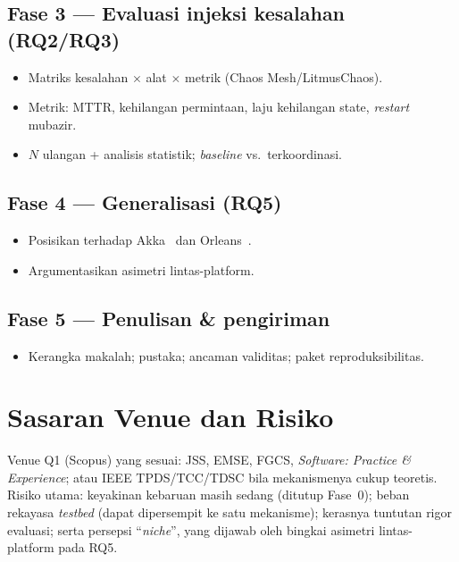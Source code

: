 \subsection*{Fase 3 --- Evaluasi injeksi kesalahan (RQ2/RQ3)}
\begin{itemize}[leftmargin=2.2em,nosep]
  \item[\cbtodo] Matriks kesalahan $\times$ alat $\times$ metrik (Chaos Mesh/LitmusChaos).
  \item[\cbtodo] Metrik: MTTR, kehilangan permintaan, laju kehilangan state, \emph{restart} mubazir.
  \item[\cbtodo] $N$ ulangan + analisis statistik; \emph{baseline} vs.\ terkoordinasi.
\end{itemize}

\subsection*{Fase 4 --- Generalisasi (RQ5)}
\begin{itemize}[leftmargin=2.2em,nosep]
  \item[\cbtodo] Posisikan terhadap Akka~\cite{akkaHealth,akkaLease} dan Orleans~\cite{orleans}.
  \item[\cbtodo] Argumentasikan asimetri lintas-platform.
\end{itemize}

\subsection*{Fase 5 --- Penulisan \& pengiriman}
\begin{itemize}[leftmargin=2.2em,nosep]
  \item[\cbtodo] Kerangka makalah; pustaka; ancaman validitas; paket reproduksibilitas.
\end{itemize}

\section{Sasaran Venue dan Risiko}
Venue Q1 (Scopus) yang sesuai: JSS, EMSE, FGCS, \emph{Software: Practice \& Experience};
atau IEEE TPDS/TCC/TDSC bila mekanismenya cukup teoretis. Risiko utama: keyakinan
kebaruan masih sedang (ditutup Fase~0); beban rekayasa \emph{testbed} (dapat dipersempit
ke satu mekanisme); kerasnya tuntutan rigor evaluasi; serta persepsi ``\emph{niche}'',
yang dijawab oleh bingkai asimetri lintas-platform pada RQ5.
